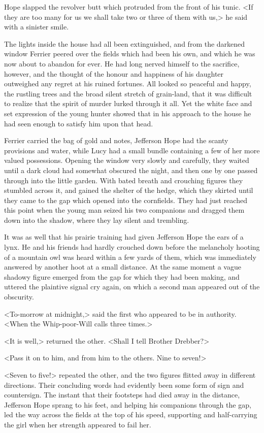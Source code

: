 Hope slapped the revolver butt which protruded from the front of his tunic. <If they are too many for us we shall take two or three of them with us,> he said with a sinister smile.

The lights inside the house had all been extinguished, and from the darkened window Ferrier peered over the fields which had been his own, and which he was now about to abandon for ever. He had long nerved himself to the sacrifice, however, and the thought of the honour and happiness of his daughter outweighed any regret at his ruined fortunes. All looked so peaceful and happy, the rustling trees and the broad silent stretch of grain-land, that it was difficult to realize that the spirit of murder lurked through it all. Yet the white face and set expression of the young hunter showed that in his approach to the house he had seen enough to satisfy him upon that head.

Ferrier carried the bag of gold and notes, Jefferson Hope had the scanty provisions and water, while Lucy had a small bundle containing a few of her more valued possessions. Opening the window very slowly and carefully, they waited until a dark cloud had somewhat obscured the night, and then one by one passed through into the little garden. With bated breath and crouching figures they stumbled across it, and gained the shelter of the hedge, which they skirted until they came to the gap which opened into the cornfields. They had just reached this point when the young man seized his two companions and dragged them down into the shadow, where they lay silent and trembling.

It was as well that his prairie training had given Jefferson Hope the ears of a lynx. He and his friends had hardly crouched down before the melancholy hooting of a mountain owl was heard within a few yards of them, which was immediately answered by another hoot at a small distance. At the same moment a vague shadowy figure emerged from the gap for which they had been making, and uttered the plaintive signal cry again, on which a second man appeared out of the obscurity.

<To-morrow at midnight,> said the first who appeared to be in authority. <When the Whip-poor-Will calls three times.>

<It is well,> returned the other. <Shall I tell Brother Drebber?>

<Pass it on to him, and from him to the others. Nine to seven!>

<Seven to five!> repeated the other, and the two figures flitted away in different directions. Their concluding words had evidently been some form of sign and countersign. The instant that their footsteps had died away in the distance, Jefferson Hope sprang to his feet, and helping his companions through the gap, led the way across the fields at the top of his speed, supporting and half-carrying the girl when her strength appeared to fail her.

